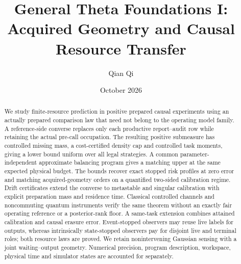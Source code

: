 \documentclass[11pt,reqno]{amsart}
\title[Acquired geometry and causal resource transfer]{General Theta Foundations I:\\Acquired Geometry and Causal Resource Transfer}
\author{Qian Qi}\date{October 2026}
\numberwithin{equation}{section}
\theoremstyle{definition}
\theoremstyle{remark}
\begin{document}
\begin{abstract}
We study finite-resource prediction in positive prepared causal experiments using an actually prepared comparison law that need not belong to the operating model family. A reference-side converse replaces only each productive report--audit row while retaining the actual pre-call occupation. The resulting positive submeasure has controlled missing mass, a cost-certified density cap and controlled task moments, giving a lower bound uniform over all legal strategies. A common parameter-independent approximate balancing program gives a matching upper at the same expected physical budget. The bounds recover exact stopped risk profiles at zero error and matching acquired-geometry orders on a quantified two-sided calibration regime. Drift certificates extend the converse to metastable and singular calibration with explicit preparation mass and residence time. Classical controlled channels and noncommuting quantum instruments verify the same theorem without an exactly fair operating reference or a posterior-rank floor. A same-task extension combines attained calibration and causal erasure error. Event-stopped observers may reuse live labels for outputs, whereas intrinsically state-stopped observers pay for disjoint live and terminal roles; both resource laws are proved. We retain nonintervening Gaussian sensing with a joint waiting--output geometry. Numerical precision, program description, workspace, physical time and simulator states are accounted for separately.
\end{abstract}
\maketitle


















\appendix



\end{document}
